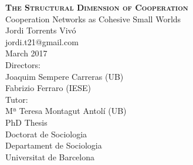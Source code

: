 \begin{titlingpage}
\begin{center}
{\HUGE \textsc{\textbf{The Structural Dimension of Cooperation}}}\\[1cm]
{\LARGE Cooperation Networks as Cohesive Small Worlds}\\[2cm]
{\Large Jordi Torrents Vivó} \\
{\large jordi.t21@gmail.com}\\[1cm]
{\Large March 2017}\\[4cm]
{\large Directors:} \\[0.2cm]
{\Large Joaquim Sempere Carreras (UB)} \\[0.2cm]
{\Large Fabrizio Ferraro (IESE)} \\[0.5cm]
{\large Tutor:} \\[0.2cm]
{\Large Mª Teresa Montagut Antolí (UB)} \\[1.5cm]
{\LARGE PhD Thesis}\\[0.5cm]
{\LARGE Doctorat de Sociologia}\\[2cm]
{\Large Departament de Sociologia} \\[0.5cm]
{\LARGE Universitat de Barcelona}\\
\end{center}
\end{titlingpage}
\cleardoublepage
